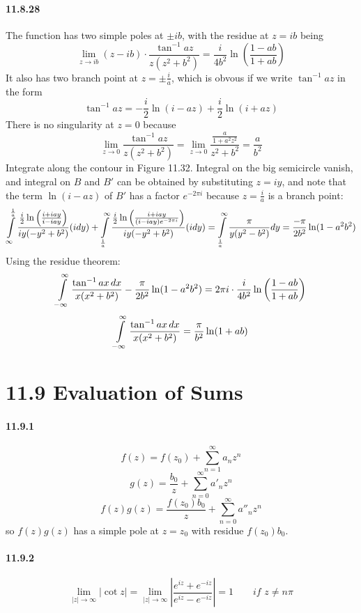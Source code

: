 \documentclass[a4paper]{article}
\begin{document}
\paragraph{11.8.28}
The function has two simple poles at $\pm ib$, with the residue at $z=ib$ being
\[
\lim_{z\to ib}(z-ib)\cdot\frac{\tan^{-1}az}{z(z^2+b^2)}=\frac{i}{4b^2}\ln\left(\frac{1-ab}{1+ab} \right)
\]
It also has two branch point at $z=\pm\frac{i}{a}$, which is obvous if we write $\tan^{-1}az$ in the form
\[
\tan^{-1}az=-\frac{i}{2}\ln(i-az)+\frac{i}{2}\ln(i+az)
\]
There is no singularity at $z=0$ because
\[
\lim_{z\to0}\frac{\tan^{-1}az}{z(z^2+b^2)}=\lim_{z\to0}\frac{\frac{a}{1+a^2z^2}}{z^2+b^2}=\frac{a}{b^2}
\]
Integrate along the contour in Figure 11.32. Integral on the big semicircle vanish, and integral on $B$ and $B'$ can be obtained by substituting $z=iy$, and note that the term $\ln(i-az)$ of $B'$ has a factor $e^{-2\pi i}$ because $z=\frac{i}{a}$ is a branch point:
\[
\int\displaylimits_{\infty}^{\frac{1}{a}}\frac{\frac{i}{2}\ln\left(\frac{i+iay}{i-iay}\right)}{iy(-y^2+b^2)}(idy)+\int\displaylimits_{\frac{1}{a}}^\infty\frac{\frac{i}{2}\ln\left(\frac{i+iay}{(i-iay)e^{-2\pi i}} \right)}{iy(-y^2+b^2)}(idy)=\int\displaylimits_{\frac{1}{a}}^\infty\frac{\pi}{y(y^2-b^2)}dy=\frac{-\pi}{2b^2}\ln(1-a^2b^2)
\]
Using the residue theorem:
\[
\int\displaylimits_{-\infty}^\infty\frac{\tan^{-1}ax\,dx}{x(x^2+b^2)}-\frac{\pi}{2b^2}\ln(1-a^2b^2)=2\pi i\cdot\frac{i}{4b^2}\ln\left(\frac{1-ab}{1+ab} \right)
\]
\[
\int\displaylimits_{-\infty}^\infty\frac{\tan^{-1}ax\,dx}{x(x^2+b^2)}=\frac{\pi}{b^2}\ln(1+ab)
\]

\section*{11.9 Evaluation of Sums}
\paragraph{11.9.1}
\[
f(z)=f(z_0)+\sum_{n=1}^\infty a_nz^n
\]
\[
g(z)=\frac{b_0}{z}+\sum_{n=0}^\infty a'_nz^n
\]
\[
f(z)g(z)=\frac{f(z_0)b_0}{z}+\sum_{n=0}^\infty a''_nz^n
\]
so $f(z)g(z)$ has a simple pole at $z=z_0$ with residue $f(z_0)b_0$.

\paragraph{11.9.2}
\[
\lim_{|z|\to\infty}|\cot z|=\lim_{|z|\to\infty}\left|\frac{e^{iz}+e^{-iz}}{e^{iz}-e^{-iz}} \right|=1\qquad \textit{if $z\neq n\pi$}
\]
\end{document}
